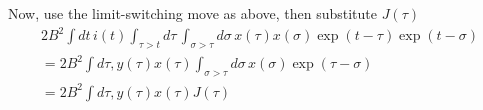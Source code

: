 \documentclass[12pt]{article}
\begin{document}
Now, use the limit-switching move as above, then substitute $J(\tau)$
\begin{eqnarray}
2B^2 \int{dt\, i(t) \int_{\tau>t}{d\tau\, \int_{\sigma>\tau}{d\sigma\, x(\tau) x(\sigma) \exp(t-\tau)\exp(t-\sigma)}}}
  \\ = 2B^2 \int{d\tau, y(\tau)x(\tau) \int_{\sigma > \tau}{d\sigma\, x(\sigma)\exp(\tau-\sigma)}}
  \\ = 2B^2 \int{d\tau, y(\tau)x(\tau)J(\tau)}
\end{eqnarray}



%
\end{document}

